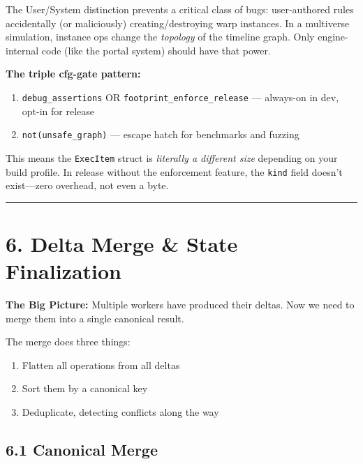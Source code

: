 \documentclass[11pt]{book}
\newenvironment{directors}
{\begin{mdframed}[
  linecolor=blue!60,
  linewidth=2pt,
  leftline=true,
  rightline=false,
  topline=false,
  bottomline=false,
  backgroundcolor=blue!3,
  innerleftmargin=12pt,
  innerrightmargin=10pt,
  innertopmargin=8pt,
  innerbottommargin=8pt,
  skipabove=12pt,
  skipbelow=12pt
]\small\sffamily\color{blue!70!black}}
{\end{mdframed}}
\newenvironment{bigpicture}
{\begin{mdframed}[
  linecolor=purple!60,
  linewidth=2pt,
  leftline=true,
  rightline=false,
  topline=false,
  bottomline=false,
  backgroundcolor=purple!3,
  innerleftmargin=12pt,
  innerrightmargin=10pt,
  innertopmargin=8pt,
  innerbottommargin=8pt,
  skipabove=12pt,
  skipbelow=12pt
]\small\sffamily\color{purple!70!black}\textbf{The Big Picture:} }
{\end{mdframed}}
\begin{document}
\begin{directors}
The User/System distinction prevents a critical class of bugs: user-authored rules accidentally (or maliciously) creating/destroying warp instances. In a multiverse simulation, instance ops change the \emph{topology} of the timeline graph. Only engine-internal code (like the portal system) should have that power.

\textbf{The triple cfg-gate pattern:}

\begin{enumerate}
\item \texttt{debug\_assertions} OR \texttt{footprint\_enforce\_release} --- always-on in dev, opt-in for release
\item \texttt{not(unsafe\_graph)} --- escape hatch for benchmarks and fuzzing
\end{enumerate}

This means the \texttt{ExecItem} struct is \emph{literally a different size} depending on your build profile. In release without the enforcement feature, the \texttt{kind} field doesn't exist---zero overhead, not even a byte.
\end{directors}

\begin{center}\rule{0.5\linewidth}{0.5pt}\end{center}

\section{6. Delta Merge \& State Finalization}\label{delta-merge-state-finalization}

\begin{bigpicture}
Multiple workers have produced their deltas. Now we need to merge them into a single canonical result.

The merge does three things:
\begin{enumerate}
\item Flatten all operations from all deltas
\item Sort them by a canonical key
\item Deduplicate, detecting conflicts along the way
\end{enumerate}
\end{bigpicture}

\subsection{6.1 Canonical Merge}
\end{document}

